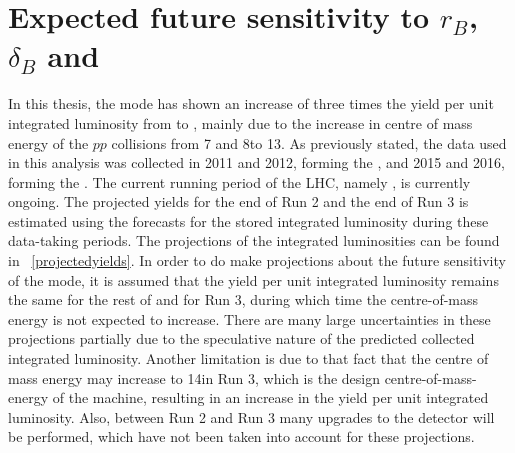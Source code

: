 \section{Expected future sensitivity to $r_B$, $\delta_B$ and \Pgamma}
\label{sec:interpretation:futuresensitivity}

In this thesis, the \btodkst mode has shown an increase of three times the yield per unit integrated luminosity from \runone to \runtwo, mainly due to the increase in centre of mass energy of the $pp$ collisions from 7 and 8\tev to 13\tev. As previously stated, the data used in this analysis was collected in 2011 and 2012, forming the \runone \dataset, and 2015 and 2016, forming the \runtwo \dataset. The current running period of the LHC, namely \runtwo, is currently ongoing. The projected yields for the end of Run 2 and the end of Run 3 is estimated using the forecasts for the stored integrated luminosity during these data-taking periods. The projections of the integrated luminosities can be found in \tab~\ref{projectedyields}. In order to do make projections about the future sensitivity of the \btodkst mode, it is assumed that the yield per unit integrated luminosity remains the same for the rest of \runtwo and for Run 3, during which time the centre-of-mass energy is not expected to increase. There are many large uncertainties in these projections partially due to the speculative nature of the predicted collected integrated luminosity. Another limitation is due to that fact that the centre of mass energy may increase to 14\tev in Run 3, which is the design centre-of-mass-energy of the machine, resulting in an increase in the yield per unit integrated luminosity.  Also, between Run 2 and Run 3 many upgrades to the detector will be performed, which have not been taken into account for these projections.

\begin{table}
\caption{Yields and projected yields for different data-taking periods of the LHC. The entries in bold are projected yields, whereas the other entries refer to data used in this thesis.}
\label{projectedyields}
\end{table}

